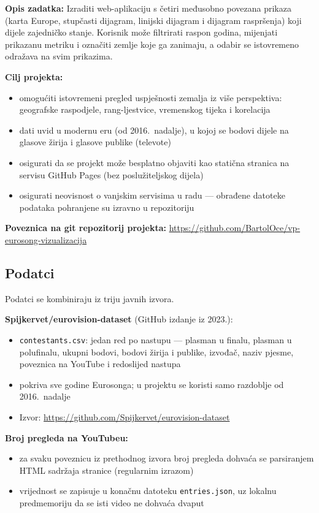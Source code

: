 \documentclass[a4paper,11pt]{article}
\begin{document}
\textbf{Opis zadatka:} Izraditi web-aplikaciju s četiri međusobno povezana prikaza (karta Europe, stupčasti dijagram, linijski dijagram i dijagram raspršenja) koji dijele zajedničko stanje. Korisnik može filtrirati raspon godina, mijenjati prikazanu metriku i označiti zemlje koje ga zanimaju, a odabir se istovremeno odražava na svim prikazima.

\textbf{Cilj projekta:}
\begin{itemize}
  \item omogućiti istovremeni pregled uspješnosti zemalja iz više perspektiva: geografske raspodjele, rang-ljestvice, vremenskog tijeka i korelacija
  \item dati uvid u modernu eru (od 2016.\ nadalje), u kojoj se bodovi dijele na glasove žirija i glasove publike (televote)
  \item osigurati da se projekt može besplatno objaviti kao statična stranica na servisu GitHub Pages (bez poslužiteljskog dijela)
  \item osigurati neovisnost o vanjskim servisima u radu — obrađene datoteke podataka pohranjene su izravno u repozitoriju
\end{itemize}

\textbf{Poveznica na git repozitorij projekta:} \url{https://github.com/BartolOce/vp-eurosong-vizualizacija}

\subsection{Podatci}

Podatci se kombiniraju iz triju javnih izvora.

\textbf{Spijkervet/eurovision-dataset} (GitHub izdanje iz 2023.):
\begin{itemize}
  \item \texttt{contestants.csv}: jedan red po nastupu — plasman u finalu, plasman u polufinalu, ukupni bodovi, bodovi žirija i publike, izvođač, naziv pjesme, poveznica na YouTube i redoslijed nastupa
  \item pokriva sve godine Eurosonga; u projektu se koristi samo razdoblje od 2016.\ nadalje
  \item Izvor: \url{https://github.com/Spijkervet/eurovision-dataset}
\end{itemize}

\textbf{Broj pregleda na YouTubeu:}
\begin{itemize}
  \item za svaku poveznicu iz prethodnog izvora broj pregleda dohvaća se parsiranjem HTML sadržaja stranice (regularnim izrazom)
  \item vrijednost se zapisuje u konačnu datoteku \texttt{entries.json}, uz lokalnu predmemoriju da se isti video ne dohvaća dvaput
\end{itemize}
\end{document}
